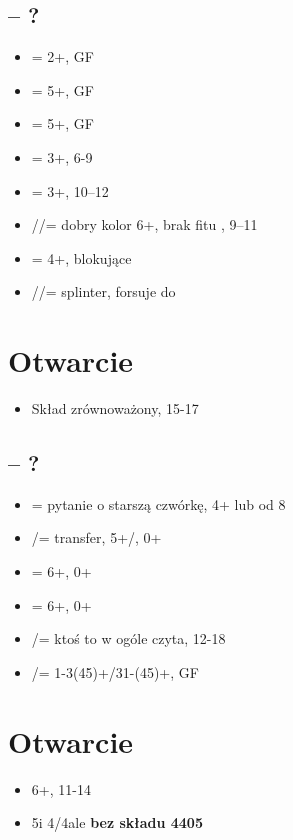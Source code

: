 \documentclass[12pt]{article}
\begin{document}
\subsection{\texorpdfstring{\Ss[1] – ?}{1S – ?}}
\begin{itemize}
    \item \Cs[2] = 2+\Cs, GF
    \item \Ds[2] = 5+\Ds, GF
    \item \Hs[2] = 5+\Hs, GF
    \item \Ss[2] = 3+\Ss, 6-9 
    \item \NT[2] = 3+\Ss, 10–12
    \item \Cs[3]/\Ds/\Hs[] = dobry kolor 6+, brak fitu \Ss, 9–11
    \item \Ss[3] = 4+\Ss, blokujące
    \item \Cs[4]/\Ds/\Hs[] = splinter, forsuje do \Ss[4]
\end{itemize}

\newpage
\section{Otwarcie \texorpdfstring{\NT[1]}{1NT}}
\begin{itemize}
    \item Skład zrównoważony, 15-17
\end{itemize}
\subsection{\texorpdfstring{\NT[1] – ?}{1NT – ?}}
\begin{itemize}
    \item \Cs[2] = pytanie o starszą czwórkę, 4+ lub od 8
    \item \Ds[2]/\Hs[] = transfer, 5+\Hs/\Ss, 0+
    \item \Ss[2] = 6+\Cs, 0+
    \item \NT[2] = 6+\Ds, 0+
    \item \Cs[3]/\Ds[] = ktoś to w ogóle czyta, 12-18 
    \item \Hs[3]/\Ss[] = 1-3(45)+/31-(45)+, GF
\end{itemize}

\newpage
\section{Otwarcie \texorpdfstring{\Cs[2]}{2C}}
\begin{itemize}
    \item 6+\Cs, 11-14
    \item 5\Cs[] i 4\Hs/4\Ss[] ale \textbf{bez składu 4405}
\end{itemize}
\end{document}
